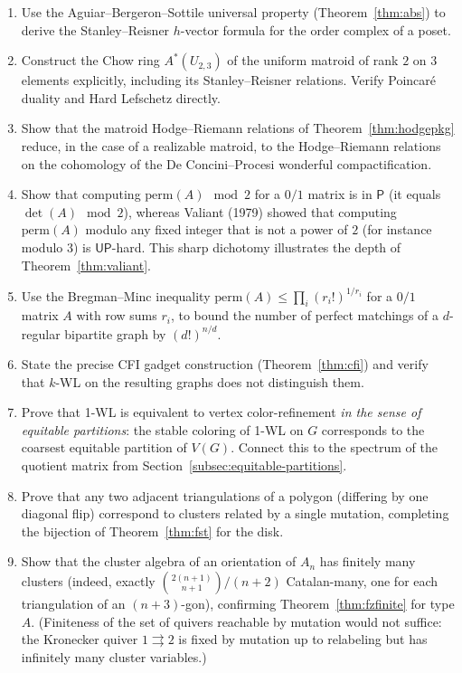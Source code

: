 \begin{enumerate}[resume]
\item Use the Aguiar--Bergeron--Sottile universal property
(Theorem~\ref{thm:abs}) to derive the Stanley--Reisner $h$-vector
formula for the order complex of a poset.

\item Construct the Chow ring $A^*(U_{2, 3})$ of the uniform matroid of
rank $2$ on $3$ elements explicitly, including its Stanley--Reisner
relations. Verify Poincar\'e duality and Hard Lefschetz directly.

\item Show that the matroid Hodge--Riemann relations of
Theorem~\ref{thm:hodgepkg} reduce, in the case of a realizable
matroid, to the Hodge--Riemann relations on the cohomology of the
De Concini--Procesi wonderful compactification.

\item Show that computing $\mathrm{perm}(A) \mod 2$ for a $0/1$ matrix is
in $\mathsf P$ (it equals $\det(A) \mod 2$), whereas Valiant (1979)
showed that computing $\mathrm{perm}(A)$ modulo any fixed integer that
is not a power of $2$ (for instance modulo $3$) is $\mathsf{UP}$-hard.
This sharp dichotomy
illustrates the depth of Theorem~\ref{thm:valiant}.

\item Use the Bregman--Minc inequality
$\mathrm{perm}(A) \le \prod_i (r_i!)^{1/r_i}$ for a $0/1$ matrix
$A$ with row sums $r_i$, to bound the number of perfect matchings of
a $d$-regular bipartite graph by $(d!)^{n/d}$.

\item State the precise CFI gadget construction (Theorem~\ref{thm:cfi}) and
verify that $k$-WL on the resulting graphs does not distinguish them.

\item Prove that 1-WL is equivalent to vertex color-refinement
\emph{in the sense of equitable partitions}: the stable coloring of
1-WL on $G$ corresponds to the coarsest equitable partition of $V(G)$.
Connect this to the spectrum of the quotient matrix from Section~\ref{subsec:equitable-partitions}.

\item Prove that any two adjacent triangulations of a polygon (differing
by one diagonal flip) correspond to clusters related by a single
mutation, completing the bijection of Theorem~\ref{thm:fst} for the
disk.

\item Show that the cluster algebra of an orientation of $A_n$ has finitely
many clusters (indeed, exactly $\binom{2(n+1)}{n+1}/(n+2)$
Catalan-many, one for each triangulation of an $(n+3)$-gon),
confirming Theorem~\ref{thm:fzfinite} for type $A$. (Finiteness of
the set of quivers reachable by mutation would not suffice: the
Kronecker quiver $1 \rightrightarrows 2$ is fixed by mutation up to
relabeling but has infinitely many cluster variables.)


\end{enumerate}
